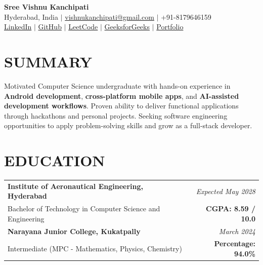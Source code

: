\documentclass[10pt, letterpaper]{article}
\begin{document}
\begin{center}
    {\fontsize{22pt}{22pt}\selectfont \textbf{Sree Vishnu Kanchipati}}\\[4pt]
    \small 
    Hyderabad, India $\vert$
    \href{mailto:vishnukanchipati@gmail.com}{vishnukanchipati@gmail.com} $\vert$
    +91-8179646159 \\[2pt]
    \href{https://in.linkedin.com/in/sree-vishnu-kanchipati-479422331}{LinkedIn} $\vert$
    \href{https://github.com/TheCraftsman1}{GitHub} $\vert$
    \href{https://leetcode.com/u/Vishnu_Kanchipati/}{LeetCode} $\vert$
    \href{https://www.geeksforgeeks.org/user/vishnukan5jhk/}{GeeksforGeeks} $\vert$
    \href{https://vishnukanchipati.me}{Portfolio}
\end{center}

\section{SUMMARY}
Motivated Computer Science undergraduate with hands-on experience in \textbf{Android development}, \textbf{cross-platform mobile apps}, and \textbf{AI-assisted development workflows}. Proven ability to deliver functional applications through hackathons and personal projects. Seeking software engineering opportunities to apply problem-solving skills and grow as a full-stack developer.

\section{EDUCATION}
\begin{tabularx}{\linewidth}{X r}
    \textbf{Institute of Aeronautical Engineering, Hyderabad} & \textit{Expected May 2028} \\
    Bachelor of Technology in Computer Science and Engineering & \textbf{CGPA: 8.59 / 10.0} \\[6pt]

    \textbf{Narayana Junior College, Kukatpally} & \textit{March 2024} \\
    Intermediate (MPC - Mathematics, Physics, Chemistry) & \textbf{Percentage: 94.0\%} \\
\end{tabularx}

\end{document}
